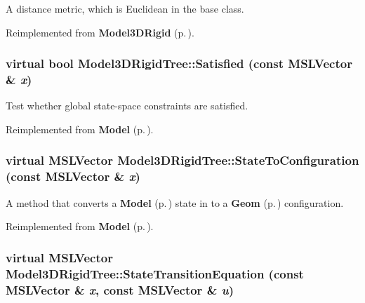 A distance metric, which is Euclidean in the base class.



Reimplemented from {\bf Model3DRigid} {\rm (p.\,\pageref{class_Model3DRigid_a4})}.
\subsubsection{\setlength{\rightskip}{0pt plus 5cm}virtual bool Model3DRigid\-Tree::Satisfied (const {\bf MSLVector} \& {\em x})\hspace{0.3cm}{\tt  [virtual]}}\label{class_Model3DRigidTree_a6}


Test whether global state-space constraints are satisfied.



Reimplemented from {\bf Model} {\rm (p.\,\pageref{class_Model_a4})}.
\subsubsection{\setlength{\rightskip}{0pt plus 5cm}virtual {\bf MSLVector} Model3DRigid\-Tree::State\-To\-Configuration (const {\bf MSLVector} \& {\em x})\hspace{0.3cm}{\tt  [virtual]}}\label{class_Model3DRigidTree_a3}


A method that converts a {\bf Model} {\rm (p.\,\pageref{class_Model})} state in to a {\bf Geom} {\rm (p.\,\pageref{class_Geom})} configuration.



Reimplemented from {\bf Model} {\rm (p.\,\pageref{class_Model_a8})}.
\subsubsection{\setlength{\rightskip}{0pt plus 5cm}virtual {\bf MSLVector} Model3DRigid\-Tree::State\-Transition\-Equation (const {\bf MSLVector} \& {\em x}, const {\bf MSLVector} \& {\em u})\hspace{0.3cm}{\tt  [virtual]}}\label{class_Model3DRigidTree_a2}



